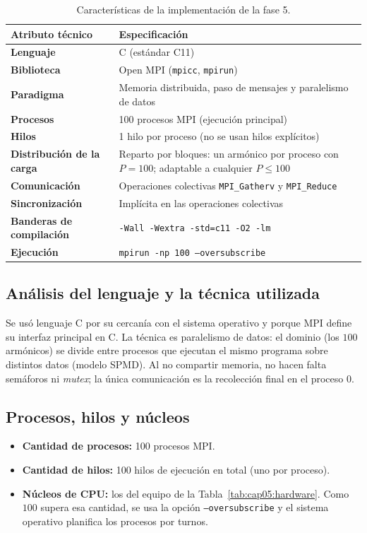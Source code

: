 \begin{table}[H]
\centering
\renewcommand{\arraystretch}{1.3}
\begin{tabular}{|l|p{10cm}|}
\hline
\textbf{Atributo técnico} & \textbf{Especificación} \\ \hline
\textbf{Lenguaje} & C (estándar C11) \\ \hline
\textbf{Biblioteca} & Open MPI (\texttt{mpicc}, \texttt{mpirun}) \\ \hline
\textbf{Paradigma} & Memoria distribuida, paso de mensajes y paralelismo de datos \\ \hline
\textbf{Procesos} & 100 procesos MPI (ejecución principal) \\ \hline
\textbf{Hilos} & 1 hilo por proceso (no se usan hilos explícitos) \\ \hline
\textbf{Distribución de la carga} & Reparto por bloques: un armónico por proceso con $P=100$; adaptable a cualquier $P \le 100$ \\ \hline
\textbf{Comunicación} & Operaciones colectivas \texttt{MPI\_Gatherv} y \texttt{MPI\_Reduce} \\ \hline
\textbf{Sincronización} & Implícita en las operaciones colectivas \\ \hline
\textbf{Banderas de compilación} & \texttt{-Wall -Wextra -std=c11 -O2 -lm} \\ \hline
\textbf{Ejecución} & \texttt{mpirun -np 100 --oversubscribe} \\ \hline
\end{tabular}
\caption{Características de la implementación de la fase 5.}
\label{tab:cap05:caracteristicas}
\end{table}

\subsection*{Análisis del lenguaje y la técnica utilizada}
Se usó lenguaje C por su cercanía con el sistema operativo y porque MPI define su interfaz principal en C. La técnica es paralelismo de datos: el dominio (los $100$ armónicos) se divide entre procesos que ejecutan el mismo programa sobre distintos datos (modelo SPMD). Al no compartir memoria, no hacen falta semáforos ni \textit{mutex}; la única comunicación es la recolección final en el proceso $0$.

\subsection*{Procesos, hilos y núcleos}
\begin{itemize}
    \item \textbf{Cantidad de procesos:} 100 procesos MPI.
    \item \textbf{Cantidad de hilos:} 100 hilos de ejecución en total (uno por proceso).
    \item \textbf{Núcleos de CPU:} los del equipo de la Tabla~\ref{tab:cap05:hardware}. Como $100$ supera esa cantidad, se usa la opción \texttt{--oversubscribe} y el sistema operativo planifica los procesos por turnos.
\end{itemize}

